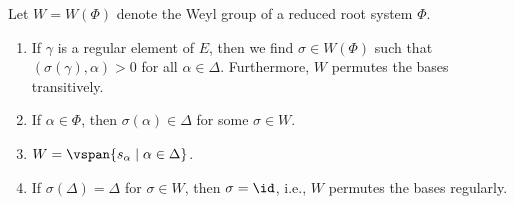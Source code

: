 Let $W = W(\Phi)$ denote the Weyl group of a reduced root system $\Phi$.
\begin{enumerate}[label=(\alph*)]
	\item If $\gamma $ is a regular element of $E$, then we find $\sigma \in W(\Phi)$
		such that $(\sigma(\gamma), \alpha) > 0$ for all $\alpha \in \Delta$.
		Furthermore, $W$ permutes the bases transitively.
	\item If $\alpha \in \Phi$, then $\sigma(\alpha) \in \Delta$ for some
		$\sigma \in W$.
	\item $W = \vspan{s_\alpha\mid \alpha \in \Delta}$.
	\item If $\sigma(\Delta) = \Delta$ for $\sigma \in W$, then
		$\sigma = \id$, i.e., $W$ permutes the bases regularly.
\end{enumerate}
